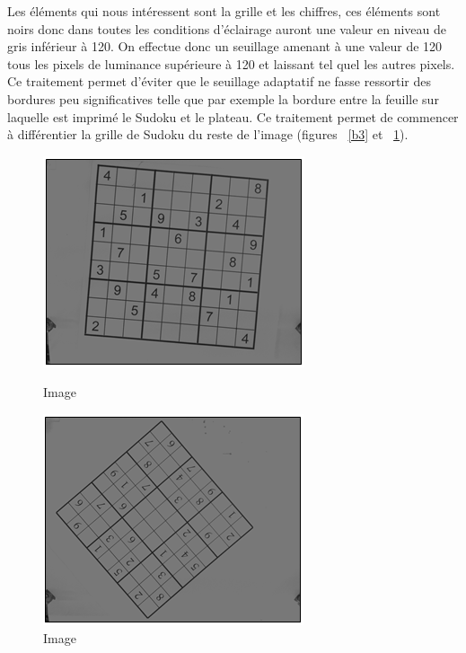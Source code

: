 \documentclass[12pt]{article}
\begin{document}
\noindent
Les éléments qui nous intéressent sont la grille et les chiffres, ces éléments sont noirs donc dans toutes les conditions d'éclairage auront une valeur en niveau de gris inférieur à 120. On effectue donc un seuillage amenant à une valeur de 120 tous les pixels de luminance supérieure à 120 et laissant tel quel les autres pixels. Ce traitement permet d'éviter que le seuillage adaptatif ne fasse ressortir des bordures peu significatives telle que par exemple la bordure entre la feuille sur laquelle est imprimé le Sudoku et le plateau. Ce traitement permet de commencer à différentier la grille de Sudoku du reste de l'image (figures ~\ref{b3} et ~\ref{b4}).
\begin{figure}[!h]
\centering
\begin{minipage}{.5\textwidth}
  \centering
  \includegraphics[scale = 0.7]{b1.png}
  \caption{\label{b3} Image }
\end{minipage}%
\begin{minipage}{.5\textwidth}
  \centering
  \includegraphics[scale = 0.7]{b2.png}
  \caption{\label{b4} Image}
\end{minipage}
\end{figure}\\
\end{document}
